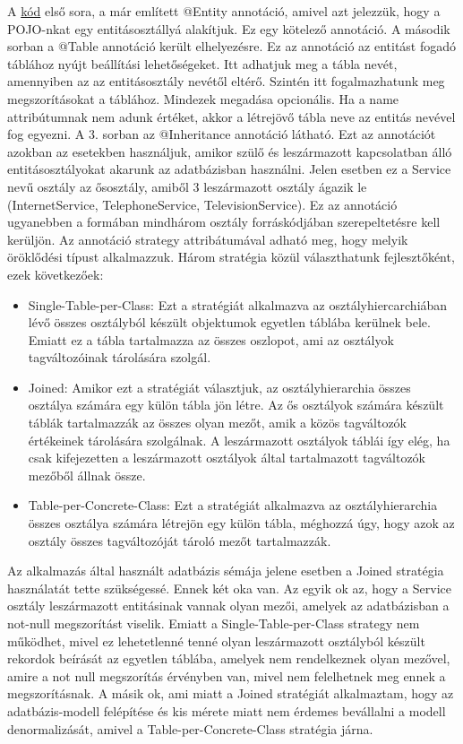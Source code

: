 \documentclass[centeredchapter]{thesis-ekf}
\theoremstyle{definition}
\theoremstyle{remark}
\begin{document}
A \hyperlink{figure-service-entity}{kód} első sora, a már említett @Entity annotáció, amivel azt jelezzük, hogy a POJO-nkat egy entitásosztállyá alakítjuk. Ez egy kötelező annotáció. A második sorban a @Table annotáció került elhelyezésre. Ez az annotáció az entitást fogadó táblához nyújt beállítási lehetőségeket. Itt adhatjuk meg a tábla nevét, amennyiben az az entitásosztály nevétől eltérő. Szintén itt fogalmazhatunk meg megszorításokat a táblához. Mindezek megadása opcionális. Ha a name attribútumnak nem adunk értéket, akkor a létrejövő tábla neve az entitás nevével fog egyezni. A 3. sorban az @Inheritance annotáció látható. Ezt az annotációt azokban az esetekben használjuk, amikor szülő és leszármazott kapcsolatban álló entitásosztályokat akarunk az adatbázisban használni. Jelen esetben ez a Service nevű osztály az ősosztály, amiből 3 leszármazott osztály ágazik le (InternetService, TelephoneService, TelevisionService). Ez az annotáció ugyanebben a formában mindhárom osztály forráskódjában szerepeltetésre kell kerüljön. Az annotáció strategy attribátumával adható meg, hogy melyik öröklődési típust alkalmazzuk. Három stratégia közül választhatunk fejlesztőként, ezek  következőek:
\begin{itemize}
	\item Single-Table-per-Class: Ezt a stratégiát alkalmazva az osztályhiercarchiában lévő összes osztályból készült objektumok egyetlen táblába kerülnek bele. Emiatt ez a tábla tartalmazza az összes oszlopot, ami az osztályok tagváltozóinak tárolására szolgál. 
	\item Joined: Amikor ezt a stratégiát választjuk, az osztályhierarchia összes osztálya számára egy külön tábla jön létre. Az ős osztályok számára készült táblák tartalmazzák az összes olyan mezőt, amik a közös tagváltozók értékeinek tárolására szolgálnak. A leszármazott osztályok táblái így elég, ha csak kifejezetten a leszármazott osztályok által tartalmazott tagváltozók mezőből állnak össze.
	\item Table-per-Concrete-Class: Ezt a stratégiát alkalmazva az osztályhierarchia összes osztálya számára létrejön egy külön tábla, méghozzá úgy, hogy azok az osztály összes tagváltozóját tároló mezőt tartalmazzák.
\end{itemize}

Az alkalmazás által használt adatbázis sémája jelene esetben a Joined stratégia használatát tette szükségessé. Ennek két oka van.
Az egyik ok az, hogy a Service osztály leszármazott entitásinak vannak olyan mezői, amelyek az adatbázisban a not-null megszorítást viselik. Emiatt a Single-Table-per-Class strategy nem működhet, mivel ez lehetetlenné tenné olyan leszármazott osztályból készült rekordok beírását az egyetlen táblába, amelyek nem rendelkeznek olyan mezővel, amire a not null megszorítás érvényben van, mivel nem felelhetnek meg ennek a megszorításnak.
A másik ok, ami miatt a Joined stratégiát alkalmaztam, hogy az adatbázis-modell felépítése és kis mérete miatt nem érdemes bevállalni a modell denormalizását, amivel a Table-per-Concrete-Class stratégia járna.
\end{document}
